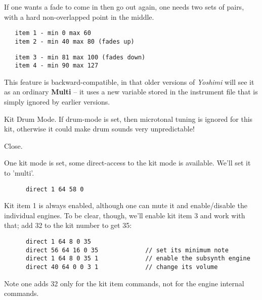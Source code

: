    If one wants a fade to come in then go out again, one needs two sets of pairs,
   with a hard non-overlapped point in the middle.

   \begin{verbatim}
   item 1 - min 0 max 60
   item 2 - min 40 max 80 (fades up)
   \end{verbatim}

   \begin{verbatim}
   item 3 - min 81 max 100 (fades down)
   item 4 - min 90 max 127
   \end{verbatim}

   This feature is backward-compatible, in that older versions of
   \textsl{Yoshimi} will
   see it as an ordinary \textbf{Multi} -- it uses a new variable stored in the
   instrument file that is simply ignored by earlier versions.

   Kit Drum Mode.
   If drum-mode  is set, then microtonal tuning is ignored for this kit,
   otherwise it could make drum sounds very unpredictable!

   Close.

   One kit mode is set, some direct-access to the kit mode is available.
 	We'll set it to 'multi'.

   \begin{verbatim}
      direct 1 64 58 0
   \end{verbatim}

   Kit item 1 is always enabled, although one can mute it and enable/disable the
   individual engines.  To be clear, though, we'll enable kit item 3 and work
   with that; add 32 to the kit number to get 35:

   \begin{verbatim}
      direct 1 64 8 0 35
      direct 56 64 16 0 35             // set its minimum note
      direct 1 64 8 0 35 1             // enable the subsynth engine
      direct 40 64 0 0 3 1             // change its volume
   \end{verbatim}

   Note one adds 32 only for the kit item commands, not for the engine internal
   commands.

